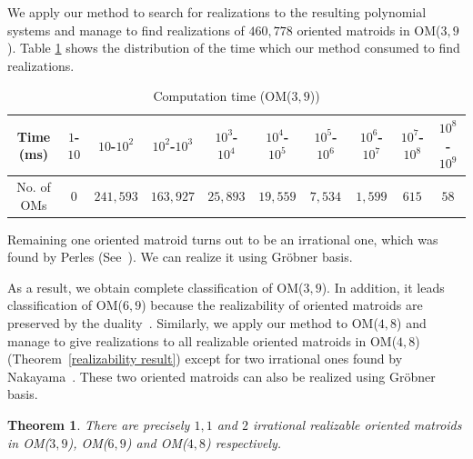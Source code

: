 \documentclass{article}
\newtheorem{thm}{Theorem}[section]
\begin{document}
We apply our method to search for realizations to the resulting polynomial systems
and manage to find realizations of $460,778$ oriented matroids in OM($3,9$).
Table \ref{time} shows the distribution of the time which our method consumed to find realizations.

\begin{table}[h]
\begin{center}
\begin{tabular}{| c | c | c | c | c | c | c | c | c | c |   }
\hline
Time (ms) & $1$-$10$ & $10$-$10^2$ & $10^2$-$10^3$ & $10^3$-$10^4$ & $10^4$-$10^5$ & $10^5$-$10^6$ & $10^6$-$10^7$ & $10^7$-$10^8$ & $10^8$-$10^9$ \\
 \hline
No. of OMs & $0$ & $241,593$ & $163,927$ & $25,893$ & $19,559$ & $7,534$ & $1,599$ & $615$ & $58$ \\
 \hline 
\end{tabular}
\end{center}
\caption{Computation time (OM($3,9$))}
\label{time}
\end{table} 

Remaining one oriented matroid turns out to be an irrational one, which was found by Perles (See~\cite[p.73]{G03}).
We can realize it using Gr\"obner basis.

As a result, we obtain complete classification of OM($3,9$).
In addition, it leads classification of OM($6,9$) because
the realizability of oriented matroids are preserved by the duality~\cite{BLSWZ99}.
Similarly, we apply our method to OM($4,8$) and manage to give realizations to all realizable oriented matroids in OM($4,8$) (Theorem~\ref{realizability result})
except for two irrational ones found by Nakayama~\cite{N07}.
These two oriented matroids can also be realized using Gr\"obner basis.
\begin{thm}
There are precisely $1,1$ and $2$ irrational realizable oriented matroids in OM($3,9$), OM($6,9$) and OM($4,8$) respectively.
\end{thm}
\end{document}
